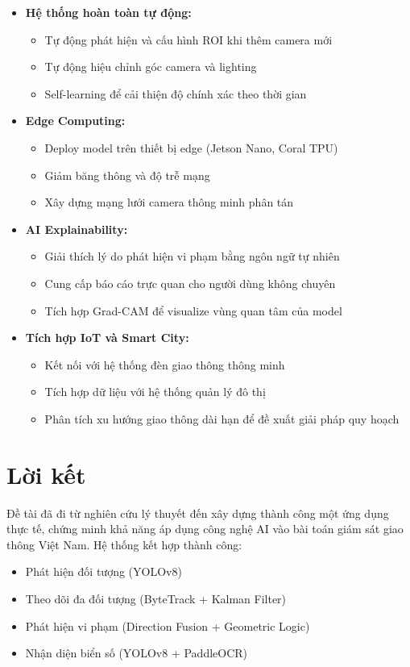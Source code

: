 \begin{itemize}
    \item \textbf{Hệ thống hoàn toàn tự động:}
    \begin{itemize}
        \item Tự động phát hiện và cấu hình ROI khi thêm camera mới
        \item Tự động hiệu chỉnh góc camera và lighting
        \item Self-learning để cải thiện độ chính xác theo thời gian
    \end{itemize}
    
    \item \textbf{Edge Computing:}
    \begin{itemize}
        \item Deploy model trên thiết bị edge (Jetson Nano, Coral TPU)
        \item Giảm băng thông và độ trễ mạng
        \item Xây dựng mạng lưới camera thông minh phân tán
    \end{itemize}
    
    \item \textbf{AI Explainability:}
    \begin{itemize}
        \item Giải thích lý do phát hiện vi phạm bằng ngôn ngữ tự nhiên
        \item Cung cấp báo cáo trực quan cho người dùng không chuyên
        \item Tích hợp Grad-CAM để visualize vùng quan tâm của model
    \end{itemize}
    
    \item \textbf{Tích hợp IoT và Smart City:}
    \begin{itemize}
        \item Kết nối với hệ thống đèn giao thông thông minh
        \item Tích hợp dữ liệu với hệ thống quản lý đô thị
        \item Phân tích xu hướng giao thông dài hạn để đề xuất giải pháp quy hoạch
    \end{itemize}
\end{itemize}

\section{Lời kết}

Đề tài đã đi từ nghiên cứu lý thuyết đến xây dựng thành công một ứng dụng thực tế, chứng minh khả năng áp dụng công nghệ AI vào bài toán giám sát giao thông Việt Nam. Hệ thống kết hợp thành công:
\begin{itemize}
    \item Phát hiện đối tượng (YOLOv8)
    \item Theo dõi đa đối tượng (ByteTrack + Kalman Filter)
    \item Phát hiện vi phạm (Direction Fusion + Geometric Logic)
    \item Nhận diện biển số (YOLOv8 + PaddleOCR)
\end{itemize}


